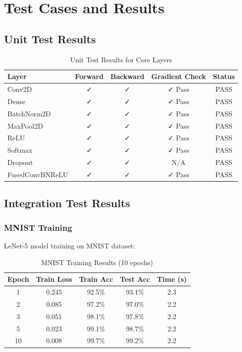 \documentclass[12pt,oneside,a4paper]{report}
\begin{document}
\section{Test Cases and Results}

\subsection{Unit Test Results}

\begin{table}[H]
\centering
\caption{Unit Test Results for Core Layers}
\begin{tabular}{|l|c|c|c|c|}
\hline
\textbf{Layer} & \textbf{Forward} & \textbf{Backward} & \textbf{Gradient Check} & \textbf{Status} \\
\hline
Conv2D & ✓ & ✓ & ✓ Pass & PASS \\
\hline
Dense & ✓ & ✓ & ✓ Pass & PASS \\
\hline
BatchNorm2D & ✓ & ✓ & ✓ Pass & PASS \\
\hline
MaxPool2D & ✓ & ✓ & ✓ Pass & PASS \\
\hline
ReLU & ✓ & ✓ & ✓ Pass & PASS \\
\hline
Softmax & ✓ & ✓ & ✓ Pass & PASS \\
\hline
Dropout & ✓ & ✓ & N/A & PASS \\
\hline
FusedConvBNReLU & ✓ & ✓ & ✓ Pass & PASS \\
\hline
\end{tabular}
\end{table}

\subsection{Integration Test Results}

\subsubsection{MNIST Training}

LeNet-5 model training on MNIST dataset:

\begin{table}[H]
\centering
\caption{MNIST Training Results (10 epochs)}
\begin{tabular}{|c|c|c|c|c|}
\hline
\textbf{Epoch} & \textbf{Train Loss} & \textbf{Train Acc} & \textbf{Test Acc} & \textbf{Time (s)} \\
\hline
1 & 0.245 & 92.5\% & 93.1\% & 2.3 \\
\hline
2 & 0.085 & 97.2\% & 97.0\% & 2.2 \\
\hline
3 & 0.051 & 98.1\% & 97.8\% & 2.2 \\
\hline
5 & 0.023 & 99.1\% & 98.7\% & 2.2 \\
\hline
10 & 0.008 & 99.7\% & 99.2\% & 2.2 \\
\hline
\end{tabular}
\end{table}
\end{document}
